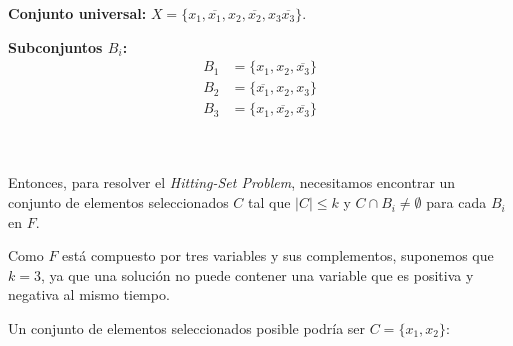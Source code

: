 \documentclass{estilo}
\begin{document}
\begin{minipage}[t]{0.7\textwidth}
    \textbf{Conjunto universal:} \(X = \{x_1, \overline{x_1}, x_2, \overline{x_2}, x_3 \overline{x_3}\}\).

    \vspace{0.5cm}

    \textbf{Subconjuntos \(B_i\):}
    \begin{align*}
        B_1 & = \{x_1, x_2, \overline{x_3}\} \\
        B_2 & = \{\overline{x_1}, x_2, x_3\} \\
        B_3 & = \{x_1, \overline{x_2}, \overline{x_3}\}
    \end{align*}
\end{minipage}
\hfill
\begin{minipage}[t]{0.3\textwidth}
\end{minipage} \\ \\

Entonces, para resolver el \textit{Hitting-Set Problem}, necesitamos encontrar un conjunto de elementos seleccionados \(C\) tal que \(|C| \leq k\) y \(C \cap B_i \neq \emptyset\) para cada \(B_i\) en \(F\).

Como $F$ está compuesto por tres variables y sus complementos, suponemos que $k = 3$, ya que una solución no puede contener una variable que es positiva y negativa al mismo tiempo. 

Un conjunto de elementos seleccionados posible podría ser \(C = \{x_1, x_2\}\):
\end{document}
